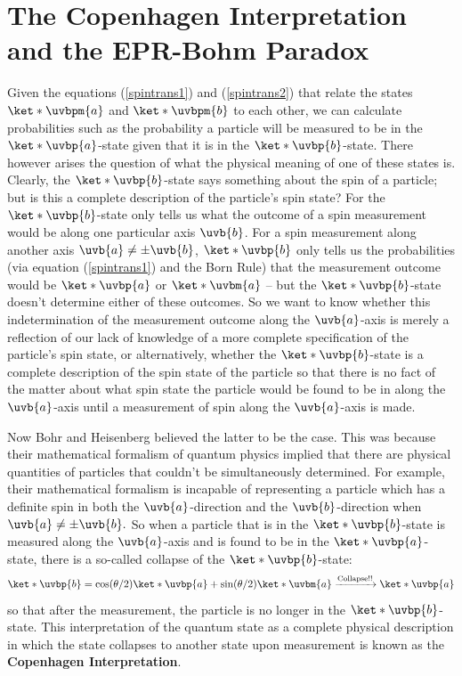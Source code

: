 \documentclass[12pt]{report}
\begin{document}
\section{The Copenhagen Interpretation and the EPR-Bohm Paradox\label{eprsec}}
Given the equations (\ref{spintrans1}) and (\ref{spintrans2}) that  relate the states $\ket*{\uvbpm{a}}$ and $\ket*{\uvbpm{b}}$ to each other, we can calculate probabilities such as the probability a particle will be measured to be in the $\ket*{\uvbp{a}}$-state given that it is in the $\ket*{\uvbp{b}}$-state. There however arises the question of what the physical meaning of one of these states is. Clearly, the $\ket*{\uvbp{b}}$-state says something about the spin of a particle; but is this a complete description of the particle's spin state? For the $\ket*{\uvbp{b}}$-state only tells us what the outcome of a spin measurement would be along one particular axis $\uvb{b}$. For a spin measurement along another axis $\uvb{a}\neq\pm\uvb{b}$, $\ket*{\uvbp{b}}$ only tells us the probabilities (via equation (\ref{spintrans1}) and the Born Rule) that the measurement outcome would be $\ket*{\uvbp{a}}$ or $\ket*{\uvbm{a}}$ -- but the $\ket*{\uvbp{b}}$-state doesn't determine either of these outcomes. So we want to know whether this indetermination of the measurement outcome along the $\uvb{a}$-axis is merely a reflection of our lack of knowledge of a more complete specification of the particle's spin state, or alternatively, whether the  $\ket*{\uvbp{b}}$-state is a complete description of the spin state of the particle so that there is no fact of the matter about what spin state the particle would be found to be in along the $\uvb{a}$-axis until a measurement of spin along the $\uvb{a}$-axis is made. 

Now Bohr and Heisenberg believed the latter to be the case. This was because their mathematical formalism of quantum physics implied that there are physical quantities of particles that couldn't be simultaneously determined. For example, their mathematical formalism is incapable of representing a particle which has a definite spin in both the $\uvb{a}$-direction and the $\uvb{b}$-direction when $\uvb{a}\neq\pm\uvb{b}.$ So when a particle that is in the $\ket*{\uvbp{b}}$-state is measured along the $\uvb{a}$-axis and is found to be in the $\ket*{\uvbp{a}}$-state, there is a so-called collapse of the $\ket*{\uvbp{b}}$-state:
$$ \ket*{\uvbp{b}}= \cos(\theta/2)\ket*{\uvbp{a}}+\sin(\theta/2) \ket*{\uvbm{a}}\xrightarrow{\text{Collapse!!}}\ket*{\uvbp{a}}$$
so that after the measurement, the particle is no longer in the $\ket*{\uvbp{b}}$-state. This interpretation of the quantum state as a complete physical description in which the state collapses to another state upon measurement is known as the \textbf{Copenhagen Interpretation}.
\end{document}
